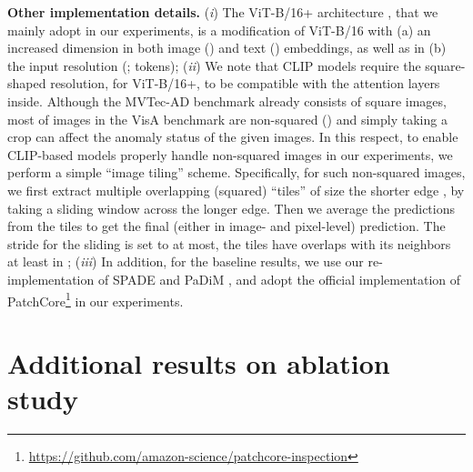 \vspace{0.05in}
\noindent\textbf{Other implementation details.}
(\textit{i}) The ViT-B/16+ architecture \cite{ilharco_gabriel_2021_5143773}, that we mainly adopt in our experiments, is a modification of ViT-B/16 \cite{touvron2021training} with (a) an increased dimension in both image () and text () embeddings, as well as in (b) the input resolution (;  tokens);
(\textit{ii}) We note that CLIP models require the square-shaped resolution, \eg  for ViT-B/16+, to be compatible with the attention layers inside. 
Although the MVTec-AD benchmark already consists of square images, most of images in the VisA benchmark are non-squared (\eg ) and simply taking a crop can affect the anomaly status of the given images. 
In this respect, to enable CLIP-based models properly handle non-squared images in our experiments, we perform a simple ``image tiling'' scheme. Specifically, for such non-squared images, we first extract multiple overlapping (squared) ``tiles'' of size the shorter edge , by taking a sliding window across the longer edge. Then we average the predictions from the tiles to get the final (either in image- and pixel-level) prediction. The stride for the sliding is set to  at most, \ie the tiles have overlaps with its neighbors at least in ; (\textit{iii}) In addition, for the baseline results, we use our re-implementation of SPADE \cite{cohen2020sub} and PaDiM \cite{defard2021padim}, and adopt the official implementation of PatchCore\footnote{\url{https://github.com/amazon-science/patchcore-inspection}} in our experiments. 



\section{Additional results on ablation study}



